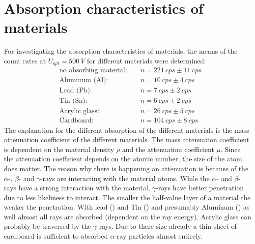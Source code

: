 \section{Absorption characteristics of materials}
%
For investigating the absorption characteristics of materials, the means of the count rates at
\(U_{opt}=\SI{500}{V}\) for different materials were determined:
%
\begin{align}
&\text{no absorbing material: }  &&n = \SI{221}{cps} \pm \SI{11}{cps}\\
&\text{Aluminum (Al): }          &&n = \SI{10}{cps} \pm \SI{4}{cps}\\
&\text{Lead (Pb): }              &&n = \SI{7}{cps} \pm \SI{2}{cps}\\
&\text{Tin (Sn): }               &&n = \SI{6}{cps} \pm \SI{2}{cps}\\
&\text{Acrylic glass: }          &&n = \SI{26}{cps} \pm \SI{5}{cps}\\
&\text{Cardboard: }              &&n = \SI{104}{cps} \pm \SI{8}{cps}
\end{align}
%
The explanation for the different absorption of the different materials is the mass attenuation coefficient of the
different materials. The mass attenuation coefficient is dependent on the material density \(\rho\) and the attenuation
coefficient \( \mu \). Since the attenuation coefficient depends on the atomic number, the size of the atom does
matter. The reason why there is happening an attenuation is because of the \(\alpha\)-, \(\beta\)- and \(\gamma\)-rays are
interacting with the material atoms. While the \(\alpha\)- and \(\beta\)-rays have a strong interaction with the material,
\(\gamma\)-rays have better penetration due to less likeliness to interact. The smaller the half-value layer of a
material the weaker the penetration. With lead () and Tin () and presumably Aluminum
() as well almost all rays are absorbed (dependent on the ray energy). Acrylic glass can probably be
traversed by the \(\gamma\)-rays. Due to there size already a thin sheet of cardboard is sufficient to absorbed
\(\alpha\)-ray particles almost entirely.
%
